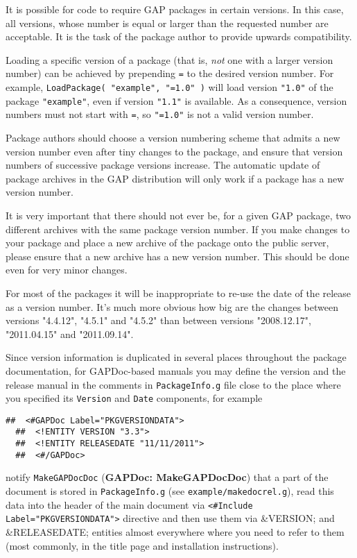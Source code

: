 \documentclass[a4paper,11pt]{report}
\begin{document}
{{ It is possible for code to require \textsf{GAP} packages in certain versions. In this case, all versions, whose number is
equal or larger than the requested number are acceptable. It is the task of
the package author to provide upwards compatibility. 

 Loading a specific version of a package (that is, \emph{not} one with a larger version number) can be achieved by prepending \texttt{=} to the desired version number. For example, \texttt{LoadPackage( "example", "=1.0" )} will load version \texttt{"1.0"} of the package \texttt{"example"}, even if version \texttt{"1.1"} is available. As a consequence, version numbers must not start with \texttt{=}, so \texttt{"=1.0"} is not a valid version number. 

 Package authors should choose a version numbering scheme that admits a new
version number even after tiny changes to the package, and ensure that version
numbers of successive package versions increase. The automatic update of
package archives in the \textsf{GAP} distribution will only work if a package has a new version number. 

 It is very important that there should not ever be, for a given \textsf{GAP} package, two different archives with the same package version number. If you
make changes to your package and place a new archive of the package onto the
public server, please ensure that a new archive has a new version number. This
should be done even for very minor changes. 

 For most of the packages it will be inappropriate to re-use the date of the
release as a version number. It's much more obvious how big are the changes
between versions "4.4.12", "4.5.1" and "4.5.2" than between versions
"2008.12.17", "2011.04.15" and "2011.09.14". 

 Since version information is duplicated in several places throughout the
package documentation, for \textsf{GAPDoc}-based manuals you may define the version and the release manual in the
comments in \texttt{PackageInfo.g} file close to the place where you specified its \texttt{Version} and \texttt{Date} components, for example 
\begin{Verbatim}[commandchars=@|B,fontsize=\small,frame=single,label=Example]
  ##  <#GAPDoc Label="PKGVERSIONDATA">
  ##  <!ENTITY VERSION "3.3">
  ##  <!ENTITY RELEASEDATE "11/11/2011">
  ##  <#/GAPDoc>
\end{Verbatim}
 notify \texttt{MakeGAPDocDoc} (\textbf{GAPDoc: MakeGAPDocDoc}) that a part of the document is stored in \texttt{PackageInfo.g} (see \texttt{example/makedocrel.g}), read this data into the header of the main document via \texttt{{\textless}\#Include Label="PKGVERSIONDATA"{\textgreater}} directive and then use them via \&VERSION; and \&RELEASEDATE; entities almost
everywhere where you need to refer to them (most commonly, in the title page
and installation instructions). }

}
\end{document}
